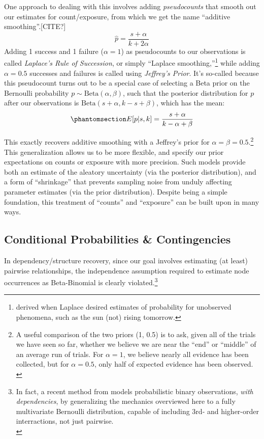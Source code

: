 \documentclass[%
	12pt,
		oneside,
		letterpaper
]{book}
\begin{document}
One approach to dealing with this involves adding \emph{pseudocounts}
that smooth out our estimates for count/exposure, from which we get the
name ``additive smoothing''.{[}CITE?{]}
\[\hat{p} = \frac{s+\alpha}{k+2\alpha} \] Adding 1 success and 1 failure
(\(\alpha=1\)) as pseudocounts to our observations is called
\emph{Laplace's Rule of Succession}, or simply ``Laplace
smoothing,''\footnote{ derived when Laplace desired estimates of
  probability for unobserved phenomena, such as the sun (not) rising
  tomorrow.} while adding \(\alpha=0.5\) successes and failures is
called using \emph{Jeffrey's Prior}. It's so-called because this
pseudocount turns out to be a special case of selecting a Beta prior on
the Bernoulli probability \(p\sim \textrm{Beta}(\alpha, \beta)\), such
that the posterior distribution for \(p\) after our observations is
\(\textrm{Beta}(s+\alpha, k-s+\beta)\), which has the mean:
\begin{equation}\phantomsection\label{eq-beta-binomial}{
E[p|s,k]=\frac{s+\alpha}{k-\alpha+\beta}
}\end{equation}

This exactly recovers additive smoothing with a Jeffrey's prior for
\(\alpha=\beta=0.5\).\footnote{ A useful comparison of the two priors
  (1, 0.5) is to ask, given all of the trials we have seen so far,
  whether we believe we are near the ``end'' or ``middle'' of an average
  run of trials. For \(\alpha=1\), we believe nearly all evidence has
  been collected, but for \(\alpha=0.5\), only half of expected evidence
  has been observed.\\
} This generalization allows us to be more flexible, and specify our
prior expectations on counts or exposure with more precision. Such
models provide both an estimate of the aleatory uncertainty (via the
posterior distribution), and a form of ``shrinkage'' that prevents
sampling noise from unduly affecting parameter estimates (via the prior
distribution). Despite being a simple foundation, this treatment of
``counts'' and ``exposure'' can be built upon in many ways.

\subsection{Conditional Probabilities \&
Contingencies}\label{conditional-probabilities-contingencies}

In dependency/structure recovery, since our goal involves estimating (at
least) pairwise relationships, the independence assumption required to
estimate node occurrences as Beta-Binomial is clearly
violated.\footnote{ In fact, a recent method from
  \autocite{MultivariateBernoullidistribution_Dai2013} models
  probabilistic binary observations, \emph{with dependencies}, by
  generalizing the mechanics overviewed here to a fully multivariate
  Bernoulli distribution, capable of including 3rd- and higher-order
  interractions, not just pairwise.\\
}
\end{document}
